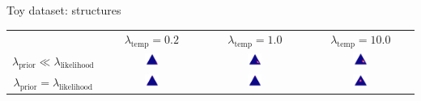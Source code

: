 \documentclass[usenames,dvipsnames,11pt,pdf,utf8,russian,aspectratio=169]{beamer}
\begin{document}
\begin{frame}{Toy dataset: structures}

    \begin{table}
        \centering
        \begin{tabular}{cccc}

             & $\lambda_\text{temp}=0.2$ & $\lambda_\text{temp}=1.0$ & $\lambda_\text{temp}=10.0$  \\
          $\lambda_\text{prior} \ll \lambda_\text{likelihood}$    & \includegraphics[width=0.15\textwidth]{triangle_0_2overfit.png} & \includegraphics[width=0.15\textwidth]{triangle_1overfit.png} & \includegraphics[width=0.15\textwidth]{triangle_10overfit.png}\\
         $\lambda_\text{prior} = \lambda_\text{likelihood}$    & \includegraphics[width=0.15\textwidth]{triangle_0_2ok.png} & \includegraphics[width=0.15\textwidth]{triangle_1elbo.png} & \includegraphics[width=0.15\textwidth]{triangle_10elbo.png}\\

\end{tabular}
\end{table}
\end{frame}
\end{document}
